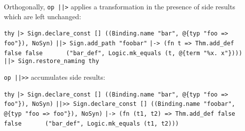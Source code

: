 \begin{isabellebody}
\begin{isamarkuptext}
\begin{mldecls}
  \end{mldecls}

  \noindent Orthogonally, \verb|op |\verb,|,\verb||\verb,|,\verb|>| applies a transformation
  in the presence of side results which are left unchanged:

  \smallskip\begin{mldecls}
\verb|thy|\isasep\isanewline%
\verb||\verb,|,\verb|> Sign.declare_const [] ((Binding.name "bar", @{typ "foo => foo"}), NoSyn)|\isasep\isanewline%
\verb||\verb,|,\verb||\verb,|,\verb|> Sign.add_path "foobar"|\isasep\isanewline%
\verb||\verb,|,\verb|-> (fn t => Thm.add_def false false|\isasep\isanewline%
\verb|      ("bar_def", Logic.mk_equals (t, @{term "%x. x"})))|\isasep\isanewline%
\verb||\verb,|,\verb||\verb,|,\verb|> Sign.restore_naming thy|\isasep\isanewline%

  \end{mldecls}

  \noindent \verb|op |\verb,|,\verb||\verb,|,\verb|>>| accumulates side results:

  \smallskip\begin{mldecls}
\verb|thy|\isasep\isanewline%
\verb||\verb,|,\verb|> Sign.declare_const [] ((Binding.name "bar", @{typ "foo => foo"}), NoSyn)|\isasep\isanewline%
\verb||\verb,|,\verb||\verb,|,\verb|>> Sign.declare_const [] ((Binding.name "foobar", @{typ "foo => foo"}), NoSyn)|\isasep\isanewline%
\verb||\verb,|,\verb|-> (fn (t1, t2) => Thm.add_def false false|\isasep\isanewline%
\verb|      ("bar_def", Logic.mk_equals (t1, t2)))|\isasep\isanewline%


\end{mldecls}
\end{isamarkuptext}
\end{isabellebody}
